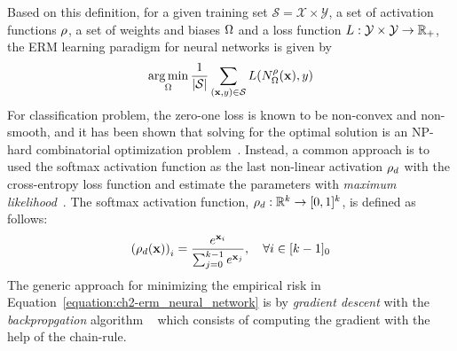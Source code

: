 \noindent
Based on this definition, for a given training set $\mathcal{S} = \mathcal{X} \times \mathcal{Y}$, a set of activation functions $\rho$, a set of weights and biases $\Omega$ and a loss function $L: \mathcal{Y} \times \mathcal{Y} \rightarrow \mathbb{R}_+$, the ERM learning paradigm for neural networks is given by
\begin{equation}
  \operatorname*{arg\,min}_{\Omega} \frac{1}{|\mathcal{S}|} \sum_{(\mathbf{x}, y) \in \mathcal{S}} L(N^\rho_\Omega(\mathbf{x}), y) 
  \label{equation:ch2-erm_neural_network}
\end{equation}
For classification problem, the zero-one loss is known to be non-convex and non-smooth, and it has been shown that solving for the optimal solution is an NP-hard combinatorial optimization problem~\cite{feldman2012agnostic,bendavid2003difficulty}.
Instead, a common approach is to used the softmax activation function as the last non-linear activation $\rho_d$ with the cross-entropy loss function and estimate the parameters with \emph{maximum likelihood}~\cite{hastie2009elements}.
The softmax activation function, $\rho_d: \mathbb{R}^k \rightarrow [0, 1]^k$, is defined as follows:
\begin{equation}
  \leftmat \act_d(\xvec) \rightmat_i = \frac{e^{\xvec_i}}{\sum_{j=0}^{k-1} e^{\xvec_j}}, \quad \forall i \in [k-1]_0
\end{equation}
The generic approach for minimizing the empirical risk in Equation~\ref{equation:ch2-erm_neural_network} is by \emph{gradient descent} with the \emph{backpropgation} algorithm ~\cite{rumelhart1986learning} which consists of computing the gradient with the help of the chain-rule.


